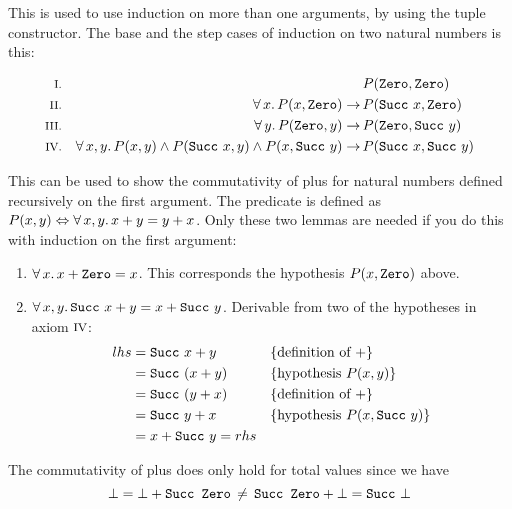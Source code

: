 \pagebreak

This is used to use induction on more than one arguments, by using the
tuple constructor. The base and the step cases of induction on two
natural numbers is this:

\begin{align*}
\rom{1} &&                                                                                        & P(\hs{Zero}     ,\hs{Zero}     ) \\
\rom{2} && \fa{x} P(x,\hs{Zero})                                                   \rightarrow \, & P(\hs{Succ} \w x,\hs{Zero}     ) \\
\rom{3} && \fa{y} P(\hs{Zero},y)                                                   \rightarrow \, & P(\hs{Zero}     ,\hs{Succ} \w y) \\
\rom{4} && \faa{x}{y} P(x,y) \wedge P(\hs{Succ} \w x,y) \wedge P(x,\hs{Succ} \w y) \rightarrow \, & P(\hs{Succ} \w x,\hs{Succ} \w y) \\
\end{align*}

This can be used to show the commutativity of plus for natural numbers
defined recursively on the first argument. The predicate is defined as
$P(x,y) \Leftrightarrow \forall \, x , y . \, x + y = y + x$. Only these two
lemmas are needed if you do this with induction on the first argument:
\begin{enumerate}
  \item $\forall \, x . \, x + \texttt{Zero} = x$. This corresponds the hypothesis
    $P(x,\texttt{Zero})$ above.
  \item $\forall \, x , y . \, \texttt{Succ} \,\, x + y = x + \texttt{Succ} \,\, y$.
    Derivable from two of the hypotheses in axiom $\romnodot{4}$:
    \begin{align*}
    lhs & = \texttt{Succ} \,\, x + y   && \{\textrm{definition of $+$}\} \\
        & = \texttt{Succ} \,\, (x + y) && \{\textrm{hypothesis $P(x,y)$}\} \\
        & = \texttt{Succ} \,\, (y + x) && \{\textrm{definition of $+$}\} \\
        & = \texttt{Succ} \,\, y + x   && \{\textrm{hypothesis $P(x,\texttt{Succ} \,\, y)$}\} \\
        & = x + \texttt{Succ} \,\, y = rhs
    \end{align*}
\end{enumerate}

The commutativity of plus does only hold for total values since we have
$$\bot = \bot + \texttt{Succ Zero} \, \neq \, \texttt{Succ Zero} + \bot = \texttt{Succ} \,\, \bot$$

